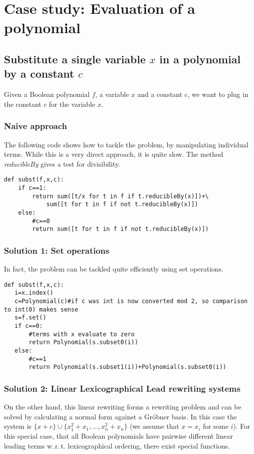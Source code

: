 \documentclass[]{article}
\newcommand{\Groebner}{Gr\"{o}bner\xspace}
\newcommand{\functionname}[1]{\textit{#1}\xspace}
\newcommand{\explfieldequations}{{x_1^2+x_1,\ldots,x_n^2+x_n}}
\begin{document}
\section{Case study: Evaluation of a polynomial}

\subsection{Substitute a single variable $x$ in a polynomial by a constant $c$}

Given a Boolean polynomial $f$, a variable $x$ and a constant $c$, we want to plug in the constant $c$ for the variable $x$.

\subsubsection{Naive approach}
The following code shows how to tackle the problem, by manipulating individual terms.
While this is a very direct approach, it is quite slow.
The method \functionname{reducibleBy} gives a test for divisibility.
\begin{verbatim}
def subst(f,x,c):
    if c==1:
        return sum([t/x for t in f if t.reducibleBy(x)])+\
            sum([t for t in f if not t.reducibleBy(x)])
    else:
        #c==0
        return sum([t for t in f if not t.reducibleBy(x)])

\end{verbatim}

\subsubsection{Solution 1: Set operations}
In fact, the problem can be tackled quite efficiently using set operations.
\begin{verbatim}
def subst(f,x,c):
   i=x.index()
   c=Polynomial(c)#if c was int is now converted mod 2, so comparison to int(0) makes sense
   s=f.set()
   if c==0:
       #terms with x evaluate to zero
       return Polynomial(s.subset0(i))
   else:
       #c==1
       return Polynomial(s.subset1(i))+Polynomial(s.subset0(i))    
\end{verbatim}

\subsubsection{Solution 2: Linear Lexicographical Lead rewriting systems}
On the other hand, this linear rewriting forms a rewriting problem and can be solved by calculating a normal form against a \Groebner 
basis.
In this case the system is $\{x+c\} \cup \{\explfieldequations\}$ (we assume that $x=x_i$ for some $i$).
For this special case, that all Boolean polynomials have pairwise different linear leading terms w.\,r.\,t. lexicographical ordering,
there exist special functions.
\end{document}
